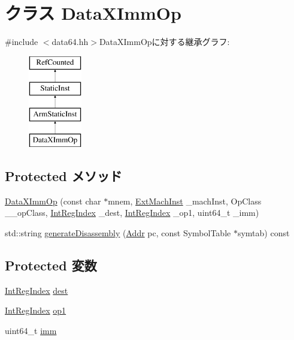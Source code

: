 \hypertarget{classArmISA_1_1DataXImmOp}{
\section{クラス DataXImmOp}
\label{classArmISA_1_1DataXImmOp}
}


{\ttfamily \#include $<$data64.hh$>$}DataXImmOpに対する継承グラフ:\begin{figure}[H]
\begin{center}
\leavevmode
\includegraphics[height=4cm]{classArmISA_1_1DataXImmOp}
\end{center}
\end{figure}
\subsection*{Protected メソッド}
\begin{DoxyCompactItemize}
\item 
\hyperlink{classArmISA_1_1DataXImmOp_a466686dc0008b6b72fc4367918e7d42a}{DataXImmOp} (const char $\ast$mnem, \hyperlink{classStaticInst_a5605d4fc727eae9e595325c90c0ec108}{ExtMachInst} \_\-machInst, OpClass \_\-\_\-opClass, \hyperlink{namespaceArmISA_ae64680ba9fb526106829d6bf92fc791b}{IntRegIndex} \_\-dest, \hyperlink{namespaceArmISA_ae64680ba9fb526106829d6bf92fc791b}{IntRegIndex} \_\-op1, uint64\_\-t \_\-imm)
\item 
std::string \hyperlink{classArmISA_1_1DataXImmOp_a95d323a22a5f07e14d6b4c9385a91896}{generateDisassembly} (\hyperlink{classm5_1_1params_1_1Addr}{Addr} pc, const SymbolTable $\ast$symtab) const 
\end{DoxyCompactItemize}
\subsection*{Protected 変数}
\begin{DoxyCompactItemize}
\item 
\hyperlink{namespaceArmISA_ae64680ba9fb526106829d6bf92fc791b}{IntRegIndex} \hyperlink{classArmISA_1_1DataXImmOp_aec72e8e45bdc87abeeeb75d2a8a9a716}{dest}
\item 
\hyperlink{namespaceArmISA_ae64680ba9fb526106829d6bf92fc791b}{IntRegIndex} \hyperlink{classArmISA_1_1DataXImmOp_a4c465c43ad568f8bcf8ae71480e9cfea}{op1}
\item 
uint64\_\-t \hyperlink{classArmISA_1_1DataXImmOp_a2b4406ad2843b5aa12d244d01d8fdc69}{imm}
\end{DoxyCompactItemize}


